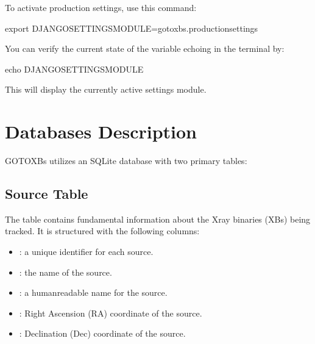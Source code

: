 \documentclass[letterpaper,10pt,english]{sphinxmanual}
\begin{document}
\sphinxAtStartPar
To activate production settings, use this command:

\begin{sphinxVerbatim}[commandchars=\\\{\}]
\PYGZdl{} export DJANGO\PYGZus{}SETTINGS\PYGZus{}MODULE=goto\PYGZus{}xbs.production\PYGZus{}settings
\end{sphinxVerbatim}

\sphinxAtStartPar
You can verify the current state of the  variable echoing in the terminal by:

\begin{sphinxVerbatim}[commandchars=\\\{\}]
\PYGZdl{} echo \PYGZdl{}DJANGO\PYGZus{}SETTINGS\PYGZus{}MODULE
\end{sphinxVerbatim}

\sphinxAtStartPar
This will display the currently active settings module.

\sphinxstepscope


\section{Databases Description}
\label{\detokenize{databases:databases-description}}\label{\detokenize{databases::doc}}
\sphinxAtStartPar
GOTO\sphinxhyphen{}XBs utilizes an SQLite database with two primary tables:


\subsection{Source Table}
\label{\detokenize{databases:source-table}}
\sphinxAtStartPar
The  table contains fundamental information about the X\sphinxhyphen{}ray binaries (XBs) being tracked. It is structured with the following columns:
\begin{itemize}
\item {} 
\sphinxAtStartPar
{}: a unique identifier for each source.

\item {} 
\sphinxAtStartPar
{}: the name of the source.

\item {} 
\sphinxAtStartPar
{}: a human\sphinxhyphen{}readable name for the source.

\item {} 
\sphinxAtStartPar
{}: Right Ascension (RA) coordinate of the source.

\item {} 
\sphinxAtStartPar
{}: Declination (Dec) coordinate of the source.

\end{itemize}
\end{document}
